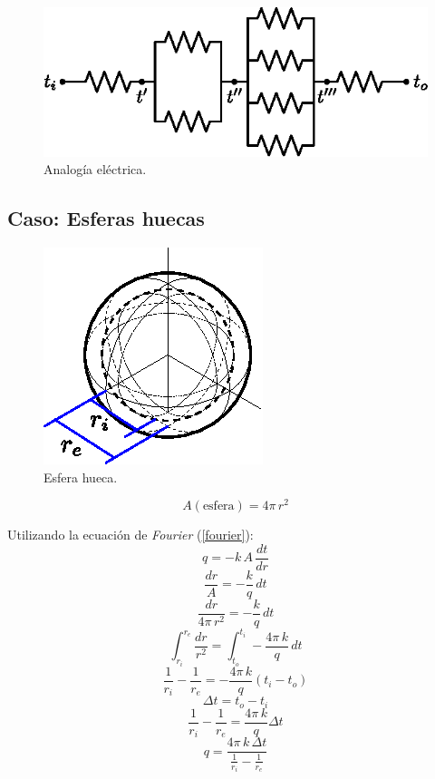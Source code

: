 \begin{figure}[!h]
\centering
\includegraphics[scale=1.10]{figura02_14.eps}
\caption{Analogía eléctrica.}
\end{figure}

\subsection{Caso: Esferas huecas}
\begin{figure}[!h]
\centering
\includegraphics[scale=1.10]{figura02_15.eps}
\caption{Esfera hueca.}
\end{figure}

\begin{equation*}
    A(\text{esfera})=4\pi\,r^2
\end{equation*}

Utilizando la ecuación de \emph{Fourier} (\ref{fourier}):
\begin{equation*}
    q=-k\,A\,\frac{dt}{dr}
\end{equation*}
\begin{equation*}
    \frac{dr}{A}=-\frac{k}{q}\,dt
\end{equation*}
\begin{equation*}
    \frac{dr}{4\pi\,r^2}=-\frac{k}{q}\,dt
\end{equation*}
\begin{equation*}
    \int_{r_i}^{r_e}\frac{dr}{r^2}=\int_{t_o}^{t_i}-\frac{4\pi\,k}{q}\,dt
\end{equation*}
\begin{equation*}
    \frac{1}{r_i}-\frac{1}{r_e}=-\frac{4\pi\,k}{q}(t_i-t_o)
\end{equation*}
\begin{equation*}
    \Delta t=t_o-t_i
\end{equation*}
\begin{equation*}
    \frac{1}{r_i}-\frac{1}{r_e}=\frac{4\pi\,k}{q}\Delta t
\end{equation*}
\begin{equation}
    q=\frac{4\pi\,k\,\Delta t}{\frac{1}{r_i}-\frac{1}{r_e}}
    \label{esfera1}
\end{equation}

